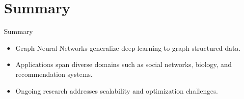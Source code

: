 \documentclass{beamer}
\begin{document}





\section{Summary}
\begin{frame}{Summary}
    \begin{itemize}
        \item Graph Neural Networks generalize deep learning to graph-structured data.
        \item Applications span diverse domains such as social networks, biology, and recommendation systems.
        \item Ongoing research addresses scalability and optimization challenges.
    \end{itemize}
\end{frame}







%     
%     



\end{document}
